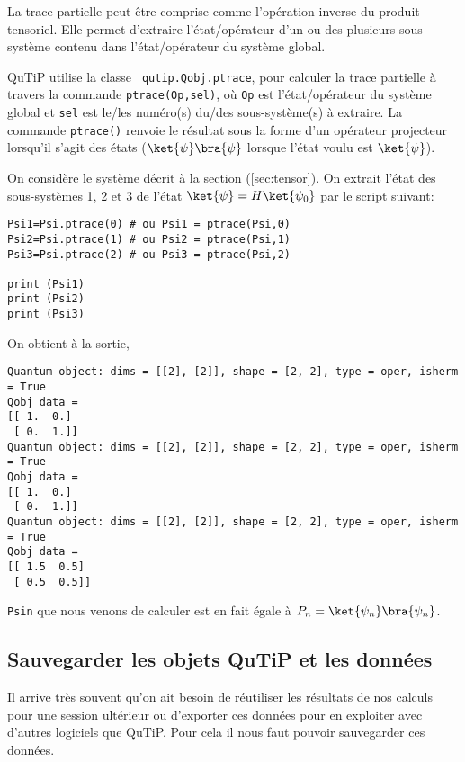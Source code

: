 La trace partielle peut être comprise comme l'opération inverse du produit 
tensoriel. Elle permet d'extraire l'état/opérateur d'un ou des plusieurs 
sous-système contenu dans l'état/opérateur du système global.

QuTiP utilise la classe \texttt{ qutip.Qobj.ptrace}, pour calculer la trace 
partielle à travers la commande \texttt{ptrace(Op,sel)}, où \texttt{Op} est 
l'état/opérateur du système global et \texttt{sel} est le/les numéro(s) du/des 
sous-système(s) à extraire. La commande \texttt{ptrace()} renvoie le résultat 
sous la forme d'un opérateur projecteur lorsqu'il s'agit des états 
($\ket{\psi}\bra{\psi}$ lorsque l'état voulu est $\ket{\psi}$).

On considère le système décrit à la section (\ref{sec:tensor}). On extrait 
l'état des sous-systèmes 1, 2 et 3 de l'état $\ket{\psi}=H\ket{\psi_0}$ par le 
script suivant:\\
\begin{lstlisting}
Psi1=Psi.ptrace(0) # ou Psi1 = ptrace(Psi,0)
Psi2=Psi.ptrace(1) # ou Psi2 = ptrace(Psi,1)
Psi3=Psi.ptrace(2) # ou Psi3 = ptrace(Psi,2)

print (Psi1)
print (Psi2)
print (Psi3)
\end{lstlisting}
On obtient à la sortie,
\begin{lstlisting}
Quantum object: dims = [[2], [2]], shape = [2, 2], type = oper, isherm = True
Qobj data =
[[ 1.  0.]
 [ 0.  1.]]
Quantum object: dims = [[2], [2]], shape = [2, 2], type = oper, isherm = True
Qobj data =
[[ 1.  0.]
 [ 0.  1.]]
Quantum object: dims = [[2], [2]], shape = [2, 2], type = oper, isherm = True
Qobj data =
[[ 1.5  0.5]
 [ 0.5  0.5]]
\end{lstlisting}

\texttt{Psin} que nous venons de calculer est en fait égale à 
$P_n=\ket{\psi_n}\bra{\psi_n}$.

\subsection{Sauvegarder les objets QuTiP et les données}

Il arrive très souvent qu'on ait besoin de réutiliser les résultats de nos 
calculs pour une session ultérieur ou d'exporter ces données pour en exploiter 
avec d'autres logiciels que QuTiP. Pour cela il nous faut pouvoir sauvegarder 
ces données.

